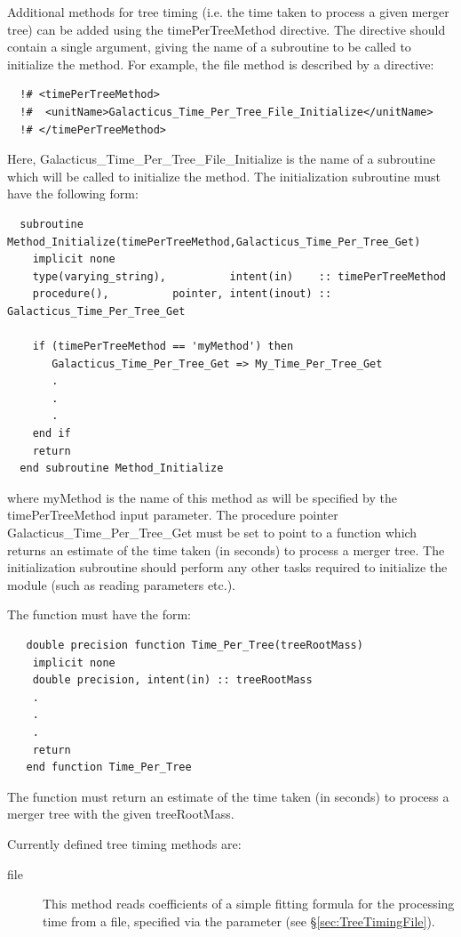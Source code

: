 Additional methods for tree timing (i.e. the time taken to process a given merger tree) can be added using the {\normalfont \ttfamily timePerTreeMethod} directive. The directive should contain a single argument, giving the name of a subroutine to be called to initialize the method. For example, the {\normalfont \ttfamily file} method is described by a directive:
\begin{verbatim}
  !# <timePerTreeMethod>
  !#  <unitName>Galacticus_Time_Per_Tree_File_Initialize</unitName>
  !# </timePerTreeMethod>
\end{verbatim}
Here, {\normalfont \ttfamily Galacticus\_Time\_Per\_Tree\_File\_Initialize} is the name of a subroutine which will be called to initialize the method. The initialization subroutine must have the following form:
\begin{verbatim}
  subroutine Method_Initialize(timePerTreeMethod,Galacticus_Time_Per_Tree_Get)
    implicit none
    type(varying_string),          intent(in)    :: timePerTreeMethod
    procedure(),          pointer, intent(inout) :: Galacticus_Time_Per_Tree_Get
    
    if (timePerTreeMethod == 'myMethod') then
       Galacticus_Time_Per_Tree_Get => My_Time_Per_Tree_Get
       .
       .
       .
    end if
    return
  end subroutine Method_Initialize
\end{verbatim}
where {\normalfont \ttfamily myMethod} is the name of this method as will be specified by the {\normalfont \ttfamily timePerTreeMethod} input parameter. The procedure pointer {\normalfont \ttfamily Galacticus\_Time\_Per\_Tree\_Get} must be set to point to a function which returns an estimate of the time taken (in seconds) to process a merger tree. The initialization subroutine should perform any other tasks required to initialize the module (such as reading parameters etc.).

The function must have the form:
\begin{verbatim}
   double precision function Time_Per_Tree(treeRootMass)
    implicit none
    double precision, intent(in) :: treeRootMass
    .
    .
    .
    return
   end function Time_Per_Tree 
\end{verbatim}
The function must return an estimate of the time taken (in seconds) to process a merger tree with the given {\normalfont \ttfamily treeRootMass}.

Currently defined tree timing methods are:
\begin{description}
 \item [{\normalfont \ttfamily file}] This method reads coefficients of a simple fitting formula for the processing time from a file, specified via the {\normalfont \ttfamily [timePerTreeFitFileName]} parameter (see \S\ref{sec:TreeTimingFile}).
\end{description}

